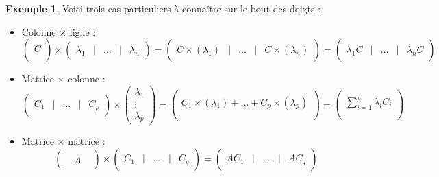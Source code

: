 \documentclass[french]{book}
\newcommand{\C}{\mathbb{C}}
\theoremstyle{plain}
\theoremstyle{definition}
\newtheorem{exa}{Exemple}[chapter]
\theoremstyle{remark}
\begin{document}
\begin{exa}
	Voici trois cas particuliers à connaître sur le bout des doigts : \begin{itemize}
		\item Colonne $\times$ ligne : $$\begin{pmatrix}\\C\\  \\ \end{pmatrix}\times\begin{pmatrix}\lambda_1&|&\ldots&|&\lambda_n\end{pmatrix}=\begin{pmatrix}&&&&\\ C\times(\lambda_1)&|&\ldots&|&C\times(\lambda_n)\\ &&&&\end{pmatrix}=\begin{pmatrix}&&&&\\ \lambda_1 C&|&\ldots&|&\lambda_n C\\ &&&&\end{pmatrix}$$
		\item Matrice $\times$ colonne : $$\begin{pmatrix}&&&&\\C_1&|&\ldots&|&C_p\\ &&&&\end{pmatrix}\times\begin{pmatrix}\lambda_1\\ \vdots\\ \lambda_p\end{pmatrix}=\begin{pmatrix}\\C_1\times(\lambda_1)+\ldots+C_p\times(\lambda_p)\\ \\ \end{pmatrix}=\begin{pmatrix}\\ \displaystyle\sum_{i=1}^{p}\lambda_iC_i\\ \\ \end{pmatrix}$$
		\item Matrice $\times$ matrice : $$\begin{pmatrix}&&\\ &A&\\ &&\end{pmatrix}\times\begin{pmatrix}&&&&\\C_1&|&\ldots&|&C_q\\&&&&\end{pmatrix}=\begin{pmatrix}&&&&\\AC_1&|&\ldots&|&AC_q\\ &&&&\end{pmatrix}$$
	\end{itemize}
\end{exa}
\end{document}
